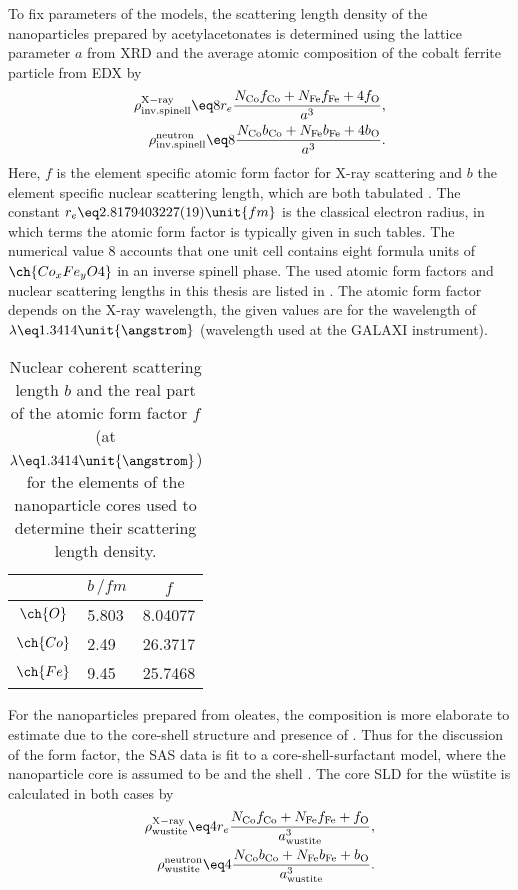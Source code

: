 \documentclass[\main/dresen_thesis.tex]{subfiles}
\begin{document}
    To fix parameters of the models, the scattering length density of the nanoparticles prepared by acetylacetonates is determined using the lattice parameter $a$ from XRD and the average atomic composition of the cobalt ferrite particle from EDX by
    \begin{align}
      \rho^\mathrm{X-ray}_\mathrm{inv. spinell} \eq 8 r_e \frac{N_\mathrm{Co} f_\mathrm{Co} + N_\mathrm{Fe} f_\mathrm{Fe} + 4 f_\mathrm{O}}{a^3},\\
      \rho^\mathrm{neutron}_\mathrm{inv. spinell} \eq 8 \frac{N_\mathrm{Co} b_\mathrm{Co} + N_\mathrm{Fe} b_\mathrm{Fe} + 4 b_\mathrm{O}}{a^3}.
    \end{align}
    Here, $f$ is the element specific atomic form factor for X-ray scattering and $b$ the element specific nuclear scattering length, which are both tabulated \cite{Sears_1992_Neutr, BerkeleyLab_1993_asf}.
    The constant $r_e \eq 2.8179403227(19) \unit{fm}$ is the classical electron radius, in which terms the atomic form factor is typically given in such tables.
    The numerical value $8$ accounts that one unit cell contains eight formula units of $\ch{Co_xFe_yO4}$ in an inverse spinell phase.
    The used atomic form factors and nuclear scattering lengths in this thesis are listed in .
    The atomic form factor depends on the X-ray wavelength, the given values are for the wavelength of $\lambda \eq 1.3414 \unit{\angstrom}$ (wavelength used at the GALAXI instrument).
    \begin{table}[ht]
      \centering
      \caption{\label{tab:monolayers:charMethod:scatteringLenghts}Nuclear coherent scattering length $b$ and the real part of the atomic form factor $f$ (at $\lambda \eq 1.3414 \unit{\angstrom}$) for the elements of the nanoparticle cores used to determine their scattering length density.}
      \begin{tabular}{ c | l | c }
          & $b \, / \unit{fm}$ & $f$ \\
        \hline
        $\ch{O}$  & 5.803  & 8.04077 \\
        $\ch{Co}$ & 2.49  & 26.3717 \\
        $\ch{Fe}$ & 9.45  & 25.7468 \\
        \hline
      \end{tabular}
    \end{table}
    For the nanoparticles prepared from oleates, the composition is more elaborate to estimate due to the core-shell structure and presence of .
    Thus for the discussion of the form factor, the SAS data is fit to a core-shell-surfactant model, where the nanoparticle core is assumed to be  and the shell .
    The core SLD for the w\"ustite is calculated in both cases by
    \begin{align}
      \rho^\mathrm{X-ray}_\mathrm{wustite} \eq 4 r_e \frac{N_\mathrm{Co} f_\mathrm{Co} + N_\mathrm{Fe} f_\mathrm{Fe} + f_\mathrm{O}}{a_\mathrm{wustite}^3},\\
      \rho^\mathrm{neutron}_\mathrm{wustite} \eq 4 \frac{N_\mathrm{Co} b_\mathrm{Co} + N_\mathrm{Fe} b_\mathrm{Fe} + b_\mathrm{O}}{a_\mathrm{wustite}^3}.
    \end{align}
\end{document}

